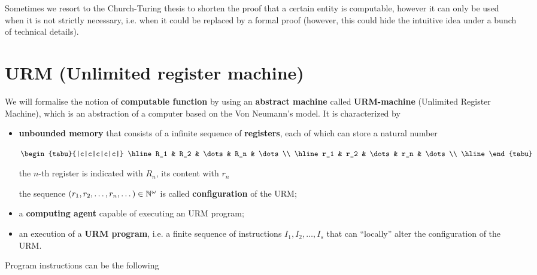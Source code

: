 Sometimes we resort to the Church-Turing thesis to shorten the proof that a certain entity is computable, however it can only be used when it is not strictly necessary, i.e. when it could be replaced by a formal proof
(however, this could hide the intuitive idea under a bunch of technical details).

\section{URM (Unlimited register machine)}

We will formalise the notion of \textbf{computable function} by using an \textbf{abstract machine} 
called \textbf{URM-machine} (Unlimited Register Machine), 
which is an abstraction of a computer based on the Von Neumann's model. It is characterized by

\begin{itemize}
\item \textbf{unbounded memory} that consists of a infinite sequence of \textbf{registers}, each of which can store a  natural number


  $\begin{tabu}{|c|c|c|c|c|}
    \hline
    R_1 & R_2 & \dots & R_n & \dots \\
    \hline
    r_1 & r_2 & \dots & r_n & \dots \\
    \hline
  \end{tabu}$

  the $n$-th register is indicated with $R_n$, its content with $r_n$

  the sequence $(r_1, r_2,\dots, r_n,\dots) \in \mathbb{N}^\omega$ is called
  \textbf{configuration} of the URM;

\item a \textbf{computing agent} capable of executing an URM program;

\item an execution of a \textbf{URM program}, i.e. a finite sequence of instructions
  $I_1, I_2, \dots, I_s$ that can ``locally'' alter the configuration
  of the URM.
\end{itemize}


Program instructions can be the following

